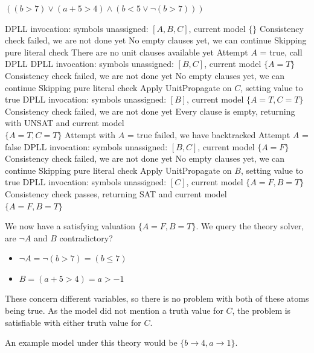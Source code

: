 \documentclass[a4paper,openany,12pt]{book}
\begin{document}
\begin{example}{$((b > 7) \lor (a + 5 > 4) \land (b < 5 \lor \neg (b > 7)))$}
    \begin{outline}
        \1[\cogs] DPLL invocation: symbols unassigned: $[A, B, C]$, current model $\{\}$
        \1[\arrow] Consistency check failed, we are not done yet
        \1[\arrow] No empty clauses yet, we can continue
        \1[\forward] Skipping pure literal check
        \1[\arrow] There are no unit clauses available yet
        \1[\arrow] Attempt $A$ = true, call DPLL
        \2[\cogs] DPLL invocation: symbols unassigned: $[B, C]$, current model $\{A=T\}$
        \2[\arrow] Consistency check failed, we are not done yet
        \2[\arrow] No empty clauses yet, we can continue
        \2[\forward] Skipping pure literal check
        \2[\arrow] Apply UnitPropagate on $C$, setting value to true
        \3[\cogs] DPLL invocation: symbols unassigned: $[B]$, current model $\{A=T, C=T\}$
        \3[\arrow] Consistency check failed, we are not done yet
        \3[\crossMark] Every clause is empty, returning with UNSAT and current model\\$\{A=T, C=T\}$
        \1[\arrow] Attempt with $A$ = true failed, we have backtracked
        \1[\arrow] Attempt $A$ = false
        \2[\cogs] DPLL invocation: symbols unassigned: $[B, C]$, current model $\{A=F\}$
        \2[\arrow] Consistency check failed, we are not done yet
        \2[\arrow] No empty clauses yet, we can continue
        \2[\forward] Skipping pure literal check
        \2[\arrow] Apply UnitPropagate on $B$, setting value to true
        \3[\cogs] DPLL invocation: symbols unassigned: $[C]$, current model $\{A=F, B=T\}$
        \3[\checkMark] Consistency check passes, returning SAT and current model\\$\{A=F, B=T\}$
    \end{outline}

    We now have a satisfying valuation $\{A=F, B=T\}$.
    We query the theory solver, are $\neg A$ and $B$ contradictory?

    \begin{itemize}
        \item $\neg A = \neg (b > 7) = (b \le 7)$
        \item $B = (a + 5 > 4) = a > -1$
    \end{itemize}

    These concern different variables, so there is no problem with both of these atoms being true.
    As the model did not mention a truth value for $C$, the problem is satisfiable with either truth value for $C$.

    An example model under this theory would be $\{b \to 4, a \to 1\}$.
\end{example}
\end{document}
